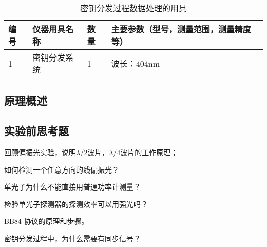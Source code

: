 \documentclass[dvipsnames, svgnames,a4paper,11pt]{article}
\begin{document}
\begin{table}[htbp]
	\centering
	\renewcommand\arraystretch{1.6}
	\caption{密钥分发过程数据处理的用具}
	\begin{tabular}{p{}|p{}|p{}|p{}}
		\hline
		编号& 仪器用具名称 & 数量 &  主要参数（型号，测量范围，测量精度等） \\
		\hline
		1	&	密钥分发系统 	& 1 & 波长：404nm	\\
		\hline
	\end{tabular}
\end{table}


\subsection{原理概述}


	




\subsection{实验前思考题}

\begin{question}
	回顾偏振光实验，说明$\lambda / 2$波片，$\lambda / 4$波片的工作原理；
\end{question}


\begin{question}
	如何检测一个任意方向的线偏振光？
\end{question}



\begin{question}
	单光子为什么不能直接用普通功率计测量？
\end{question}




\begin{question}
	检验单光子探测器的探测效率可以用强光吗？
\end{question}






\begin{question}
	BB84 协议的原理和步骤。
\end{question}





\begin{question}
	密钥分发过程中，为什么需要有同步信号？
\end{question}
\end{document}
